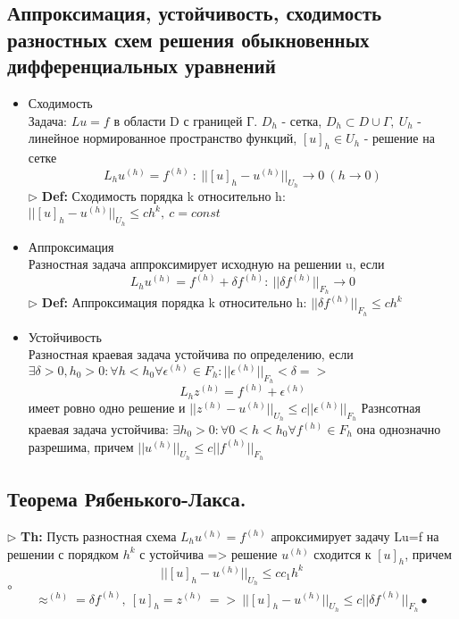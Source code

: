 \documentclass[a4paper]{article}
\begin{document}
\subsection{Аппроксимация, устойчивость, сходимость разностных схем решения обыкновенных дифференциальных уравнений}
\begin{itemize}
	\item Сходимость\\
	Задача: $Lu=f$ в области D с границей Г. $D_h$ - сетка, $D_h \subset D \cup \Gamma, \ U_h$ - линейное нормированное пространство функций, $[u]_h \in U_h$ - решение на сетке
	$$ L_hu^{(h)} = f^{(h)}\ : \ ||[u]_h -u^{(h)}||_{U_h} \rightarrow 0 \ (h \rightarrow 0)$$
	$\triangleright$ \textbf{Def:} Сходимость порядка k относительно h: $||[u]_h -u^{(h)}||_{U_h} \leq ch^k, \ c=const$ \\
	\item Аппроксимация \\
	Разностная задача аппроксимирует исходную на решении u, если
	$$ L_hu^{(h)}=f^{(h)}+\delta f^{(h)}: \ ||\delta f^{(h)}||_{F_h} \rightarrow 0 $$
	$\triangleright$ \textbf{Def:} Аппроксимация порядка k относительно h: $||\delta f^{(h)}||_{F_h} \leq ch^k$
	\item Устойчивость \\
	Разностная краевая задача устойчива по определению, если $\exists \delta >0, h_0>0: \forall h<h_0 \forall \epsilon^{(h)} \in F_h: ||\epsilon^{(h)}||_{F_h} < \delta =>$
	$$ L_hz^{(h)} = f^{(h)}+\epsilon^{(h)}$$ имеет ровно одно решение и $||z^{(h)}-u^{(h)}||_{U_h} \leq c||\epsilon^{(h)}||_{F_h}$
	Разнсотная краевая задача устойчива: $\exists h_0>0: \forall 0<h<h_0 \forall f^{(h)}\in F_h$ она однозначно разрешима, причем $||u^{(h)}||_{U_h} \leq c||f^{(h)}||_{F_h}$
\end{itemize}
\subsection{Теорема Рябенького-Лакса.}
$\triangleright$ \textbf{Th:} Пусть разностная схема $L_hu^{(h)}=f^{(h)}$ апроксимирует задачу Lu=f на решении с порядком $h^k$ с устойчива => решение $u^{(h)}$ сходится к $[u]_h$, причем $$ ||[u]_h - u^{(h)}||_{U_h} \leq cc_1h^k $$
	$\circ$ 
	$$ \approx^{(h)}=\delta f^{(h)},\ [u]_h=z^{(h)} \ => \ ||[u]_h - u^{(h)}||_{U_h} \leq c||\delta f^{(h)}||_{F_h}
	\bullet$$
\end{document}

